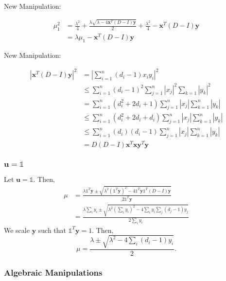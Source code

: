 \documentclass[11pt]{article}
\begin{document}
New Manipulation:

\begin{align}
    \mu_1^2&=\frac{\lambda^2}{4}+\frac{\lambda\sqrt{\lambda-4\mathbf{x}^T(D-I)\mathbf{y}}}{2}+\frac{\lambda^2}{4}-\mathbf{x}^T(D-I)\mathbf{y}\\
    &=\lambda\mu_1-\mathbf{x}^T(D-I)\mathbf{y}
\end{align}

New Manipulation:

\begin{align}
    |\mathbf{x}^T(D-I)\mathbf{y}|^2&=|\sum_{i=1}^n(d_i-1)x_iy_i|^2\\
    &\leq\sum_{i=1}^n(d_i-1)^2\sum_{j=1}^n|x_j|^2\sum_{k=1}|y_k|^2\\
    &=\sum_{i=1}^n(d_i^2+2d_i+1)\sum_{j=1}^n|x_j|\sum_{k=1}^n|y_k|\\
    &\leq\sum_{i=1}^n(d_i^2+2d_i+d_i)\sum_{j=1}^n|x_j|\sum_{k=1}^n|y_k|\\
    &\leq\sum_{i=1}^n(d_i)(d_i-1)\sum_{j=1}^n|x_j|\sum_{k=1}^n|y_k|\\
    &=D(D-I)\mathbf{x}^T\mathbf{x}\mathbf{y}^T\mathbf{y}
\end{align}

\subsubsection{$\mathbf{u}=\mathbb{1}$}

Let $\mathbf{u}=\mathbb{1}$. Then,
\begin{align}
    \mu&=\frac{\lambda\mathbb{1}^T\mathbf{y}\pm\sqrt{\lambda^2(\mathbb{1}^T\mathbf{y})^2-4\mathbb{1}^T\mathbf{y}\mathbb{1}^T(D-I)\mathbf{y}}}{2\mathbb{1}^T\mathbf{y}}\\
    &=\frac{\lambda\sum_iy_i\pm\sqrt{\lambda^2(\sum_iy_i)^2-4\sum_iy_i\sum_j(d_j-1)y_j}}{2\sum_iy_i}
\end{align}
We scale $\mathbf{y}$ such that $\mathbb{1}^T\mathbf{y}=1$. Then,
\begin{equation}
    \mu=\frac{\lambda\pm\sqrt{\lambda^2-4\sum_i(d_i-1)y_i}}{2}.
\end{equation}

\subsubsection{Algebraic Manipulations}
\end{document}
